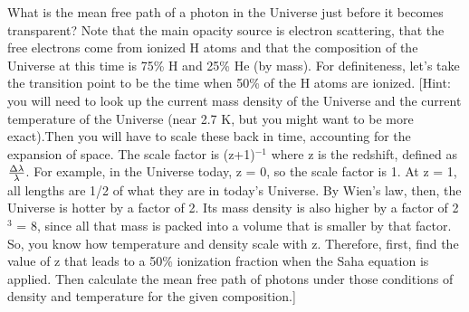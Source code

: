 \documentclass[12pt]{article}
\newenvironment{problem}[2][Problem]{\begin{trivlist}
\item[\hskip \labelsep {\bfseries #1}\hskip \labelsep {\bfseries #2.}]}{\end{trivlist}}
\begin{document}
\begin{problem}{3}
What is the mean free path of a photon in the Universe just before it becomes transparent? Note that the main opacity source is electron scattering, that the free electrons come from ionized H atoms and that the composition of the Universe at this time is 75\% H and 25\% He (by mass). For definiteness, let's take the transition point to be the time when 50\% of the H atoms are ionized. [Hint: you will need to look up the current mass density of the Universe and the current temperature of the Universe (near 2.7 K, but you might want to be more exact).Then you will have to scale these back in time, accounting for the expansion of space. The scale factor is (z+1)$^{-1}$ where z is the redshift, defined as $\Delta \lambda \over \lambda$. For example, in the Universe today, z = 0, so the scale factor is 1. At z = 1, all lengths are 1/2 of what they are in today's Universe. By Wien's law, then, the Universe is hotter by a factor of 2. Its mass density is also higher by a factor of 2$^3$ = 8, since all that mass is packed into a volume that is smaller by that factor. So, you know how temperature and density scale with z. Therefore, first, find the value of z that leads to a 50\% ionization fraction when the Saha equation is applied. Then calculate the mean free path of photons under those conditions of density and temperature for the given composition.]

\end{problem}


\bigskip
\end{document}
